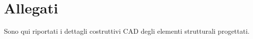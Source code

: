 \appendix
\chapter{Allegati}
\label{appendix:allegati}
Sono qui riportati i dettagli costruttivi CAD degli elementi strutturali progettati.



